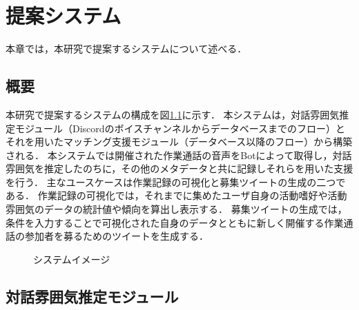 \chapter{提案システム\label{sec:proposal_system}}
\thispagestyle{plain}

本章では，本研究で提案するシステムについて述べる．

\section{概要}

本研究で提案するシステムの構成を図\ref{fig:matching_system_big_arrow}に示す．
本システムは，対話雰囲気推定モジュール（Discordのボイスチャンネルからデータベースまでのフロー）とそれを用いたマッチング支援モジュール（データベース以降のフロー）から構築される．
本システムでは開催された作業通話の音声をBotによって取得し，対話雰囲気を推定したのちに，その他のメタデータと共に記録しそれらを用いた支援を行う．
主なユースケースは作業記録の可視化と募集ツイートの生成の二つである．
作業記録の可視化では，それまでに集めたユーザ自身の活動嗜好や活動雰囲気のデータの統計値や傾向を算出し表示する．
募集ツイートの生成では，条件を入力することで可視化された自身のデータとともに新しく開催する作業通話の参加者を募るためのツイートを生成する．

\begin{figure}
    \centering
    \caption{システムイメージ}
    \label{fig:matching_system_big_arrow}
\end{figure}

\section{対話雰囲気推定モジュール\label{node:estimation_module}}

